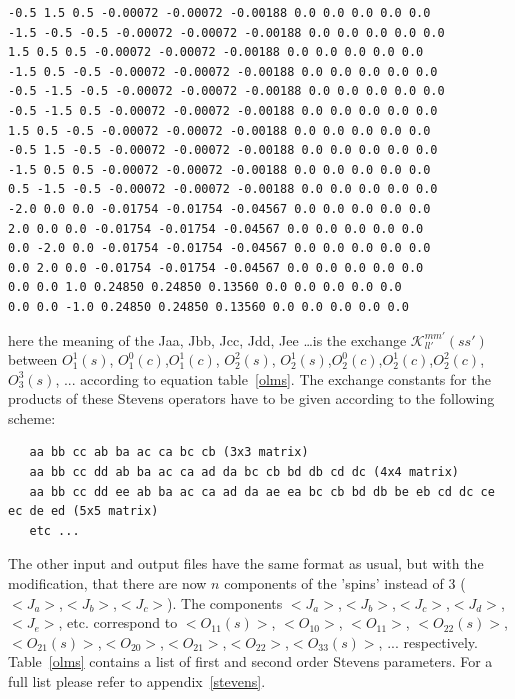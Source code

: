 {\begin{verbatim}
-0.5 1.5 0.5 -0.00072 -0.00072 -0.00188 0.0 0.0 0.0 0.0 0.0 
-1.5 -0.5 -0.5 -0.00072 -0.00072 -0.00188 0.0 0.0 0.0 0.0 0.0 
1.5 0.5 0.5 -0.00072 -0.00072 -0.00188 0.0 0.0 0.0 0.0 0.0 
-1.5 0.5 -0.5 -0.00072 -0.00072 -0.00188 0.0 0.0 0.0 0.0 0.0 
-0.5 -1.5 -0.5 -0.00072 -0.00072 -0.00188 0.0 0.0 0.0 0.0 0.0 
-0.5 -1.5 0.5 -0.00072 -0.00072 -0.00188 0.0 0.0 0.0 0.0 0.0 
1.5 0.5 -0.5 -0.00072 -0.00072 -0.00188 0.0 0.0 0.0 0.0 0.0 
-0.5 1.5 -0.5 -0.00072 -0.00072 -0.00188 0.0 0.0 0.0 0.0 0.0 
-1.5 0.5 0.5 -0.00072 -0.00072 -0.00188 0.0 0.0 0.0 0.0 0.0 
0.5 -1.5 -0.5 -0.00072 -0.00072 -0.00188 0.0 0.0 0.0 0.0 0.0 
-2.0 0.0 0.0 -0.01754 -0.01754 -0.04567 0.0 0.0 0.0 0.0 0.0 
2.0 0.0 0.0 -0.01754 -0.01754 -0.04567 0.0 0.0 0.0 0.0 0.0 
0.0 -2.0 0.0 -0.01754 -0.01754 -0.04567 0.0 0.0 0.0 0.0 0.0 
0.0 2.0 0.0 -0.01754 -0.01754 -0.04567 0.0 0.0 0.0 0.0 0.0 
0.0 0.0 1.0 0.24850 0.24850 0.13560 0.0 0.0 0.0 0.0 0.0 
0.0 0.0 -1.0 0.24850 0.24850 0.13560 0.0 0.0 0.0 0.0 0.0 
\end{verbatim}
}
here the meaning of the Jaa, Jbb, Jcc, Jdd, Jee \dots is the exchange ${\mathcal K}_{ll'}^{mm'}(ss')$ between %
$O_1^1(s)$, $O_1^0(c)$,$O_1^1(c)$, $O_2^2(s)$, $O_2^1(s)$,$O_2^0(c)$,$O_2^1(c)$,$O_2^2(c)$,$O_3^3(s)$, ...
according to equation table~\ref{olms}.
 The exchange constants for the
products of these Stevens operators have to be 
given according to the following scheme:

\begin{verbatim}
   aa bb cc ab ba ac ca bc cb (3x3 matrix)
   aa bb cc dd ab ba ac ca ad da bc cb bd db cd dc (4x4 matrix)
   aa bb cc dd ee ab ba ac ca ad da ae ea bc cb bd db be eb cd dc ce ec de ed (5x5 matrix)
   etc ...
\end{verbatim}

The other input and output files have the same format as usual, but with the modification, that
there are now $n$ components of the 'spins' instead of 3 ($<J_a>$,$<J_b>$,$<J_c>$).
The components $<J_a>$,$<J_b>$,$<J_c>$,$<J_d>$,$<J_e>$, etc. correspond to $<O_{11}(s)>$, $<O_{10}>$,
$<O_{11}>$, $<O_{22}(s)>$, $<O_{21}(s)>$,$<O_{20}>$,$<O_{21}>$,$<O_{22}>$,$<O_{33}(s)>$, ...
 respectively. Table~\ref{olms} contains a list of first and second order Stevens parameters.
For a full list please refer to appendix~\ref{stevens}.

